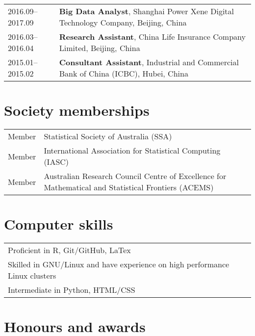 \documentclass[10pt,a4paper,]{article}
\begin{document}
\begin{tabular}{ll}
  2016.09--2017.09 & \textbf{Big Data Analyst}, Shanghai Power Xene Digital Technology Company, Beijing, China \\ 
  2016.03--2016.04 & \textbf{Research Assistant}, China Life Insurance Company Limited, Beijing, China \\ 
  2015.01--2015.02 & \textbf{Consultant Assistant}, Industrial and Commercial Bank of China (ICBC), Hubei, China \\ 
  \end{tabular}

\section{Society memberships}\label{society-memberships-1}

\begin{tabular}{ll}
  Member & Statistical Society of Australia (SSA) \\ 
  Member & International Association for Statistical Computing (IASC) \\ 
  Member & Australian Research Council Centre of Excellence for Mathematical and Statistical Frontiers (ACEMS) \\ 
  \end{tabular}

\section{Computer skills}\label{computer-skills-1}

\begin{tabular}{l}
  Proficient in R, Git/GitHub, LaTex \\ 
  Skilled in GNU/Linux and have experience on high performance Linux clusters \\ 
  Intermediate in Python, HTML/CSS \\ 
  \end{tabular}

\section{Honours and awards}\label{honours-and-awards-1}
\end{document}
